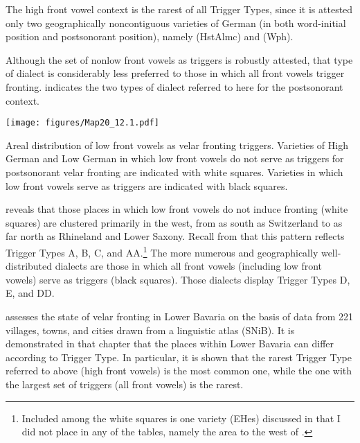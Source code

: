 The high front vowel context is the rarest of all Trigger Types, since it is attested only two geographically noncontiguous varieties of German (in both word-initial position and postsonorant position), namely  (HstAlmc) and  (Wph).

Although the set of nonlow front vowels as triggers is robustly attested, that type of dialect is considerably less preferred to those in which all front vowels trigger fronting.  indicates the two types of dialect referred to here for the postsonorant context.

\begin{map}[ph]
\texttt{[image: figures/Map20\_12.1.pdf]}
  \caption[Areal distribution of low front vowels as velar fronting triggers]{Areal distribution of low front vowels as velar fronting triggers. Varieties of High German and Low German in which low front vowels do not serve as triggers for postsonorant velar fronting are indicated with white squares. Varieties in which low front vowels serve as triggers are indicated with black squares.}
  \label{map:12:20}\label{map:20}
\end{map}\clearpage

 reveals that those places in which low front vowels do not induce fronting (white squares) are clustered primarily in the west, from as south as Switzerland to as far north as Rhineland and Lower Saxony. Recall from  that this pattern reflects Trigger Types A, B, C, and AA.\footnote{{Included among the white squares is one variety (EHes) discussed in  that I did not place in any of the tables, namely the area to the west of  \citep{Martin1957}.}} The more numerous and geographically well-distributed dialects are those in which all front vowels (including low front vowels) serve as triggers (black squares). Those dialects display Trigger Types D, E, and DD.

 assesses the state of velar fronting in Lower Bavaria on the basis of data from 221 villages, towns, and cities drawn from a linguistic atlas (SNiB). It is demonstrated in that chapter that the places within Lower Bavaria can differ according to Trigger Type. In particular, it is shown that the rarest Trigger Type referred to above (high front vowels) is the most common one, while the one with the largest set of triggers (all front vowels) is the rarest.

